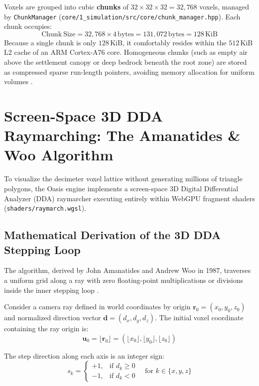 Voxels are grouped into cubic \textbf{chunks} of $32 \times 32 \times 32 = 32,768$ voxels, managed by \texttt{ChunkManager} (\texttt{core/1\_simulation/src/core/chunk\_manager.hpp}). Each chunk occupies:
\begin{equation}
\mathrm{Chunk\ Size} = 32,768 \times 4\,\mathrm{bytes} = 131,072\,\mathrm{bytes} = 128\,\mathrm{KiB}
\label{eq:chunk_memory}
\end{equation}
Because a single chunk is only $128\,\mathrm{KiB}$, it comfortably resides within the $512\,\mathrm{KiB}$ L2 cache of an ARM Cortex-A76 core. Homogeneous chunks (such as empty air above the settlement canopy or deep bedrock beneath the root zone) are stored as compressed sparse run-length pointers, avoiding memory allocation for uniform volumes \cite{laine2010efficient}.

\section{Screen-Space 3D DDA Raymarching: The Amanatides \& Woo Algorithm}

To visualize the decimeter voxel lattice without generating millions of triangle polygons, the Oasis engine implements a screen-space 3D Digital Differential Analyzer (DDA) raymarcher executing entirely within WebGPU fragment shaders (\texttt{shaders/raymarch.wgsl}).

\subsection{Mathematical Derivation of the 3D DDA Stepping Loop}

The algorithm, derived by John Amanatides and Andrew Woo in 1987, traverses a uniform grid along a ray with zero floating-point multiplications or divisions inside the inner stepping loop \cite{amanatides1987fast}.

Consider a camera ray defined in world coordinates by origin $\mathbf{r}_0 = (x_0, y_0, z_0)$ and normalized direction vector $\mathbf{d} = (d_x, d_y, d_z)$. The initial voxel coordinate containing the ray origin is:
\begin{equation}
\mathbf{u}_0 = \lfloor \mathbf{r}_0 \rfloor = (\lfloor x_0 \rfloor, \lfloor y_0 \rfloor, \lfloor z_0 \rfloor)
\label{eq:initial_voxel}
\end{equation}

The step direction along each axis is an integer sign:
\begin{equation}
s_k = \begin{cases} +1, & \text{if } d_k \ge 0 \\ -1, & \text{if } d_k < 0 \end{cases} \quad \text{for } k \in \{x, y, z\}
\label{eq:step_direction}
\end{equation}

